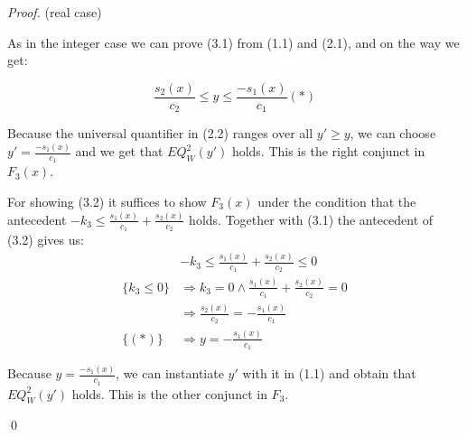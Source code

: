\documentclass{llncs}
\begin{document}
\begin{proof}
(real case)

As in the integer case we can prove (3.1) from (1.1) and (2.1), and on the way we get:

\[\frac{s_2(x)}{c_2} \leq y\leq \frac{-s_1(x)}{c_1} (*)\]

Because the universal quantifier in (2.2) ranges over all $y'\geq y$, we can choose 
$y'=\frac{-s_1(x)}{c_1}$ and we get that $EQ^2_W(y')$ holds. This is the right conjunct
in $F_3(x)$.
  
For showing (3.2) it suffices to show $F_3(x)$ under the condition that the antecedent 
$-k_3\leq \frac{s_1(x)}{c_1} + \frac{s_2(x)}{c_2}$ holds. 
Together with (3.1) the antecedent of (3.2) gives us:
\begin{align*}
  & -k_3  \leq \frac{s_1(x)}{c_1} + \frac{s_2(x)}{c_2} \leq 0 \\
  \text{\{$k_3 \leq 0$\}} & \Rightarrow  k_3 = 0 \wedge \frac{s_1(x)}{c_1} + \frac{s_2(x)}{c_2}=0 \\
  & \Rightarrow \frac{s_2(x)}{c_2} = - \frac{s_1(x)}{c_1} \\
  \text{\{$(*)$\}} & \Rightarrow  y = - \frac{s_1(x)}{c_1}
\end{align*}

Because $y=\frac{-s_1(x)}{c_1}$, we can instantiate $y'$ with it in (1.1) and obtain that 
$EQ^2_W(y')$ holds. This is the other conjunct in $F_3$.

\qed

\end{proof}
\end{document}
